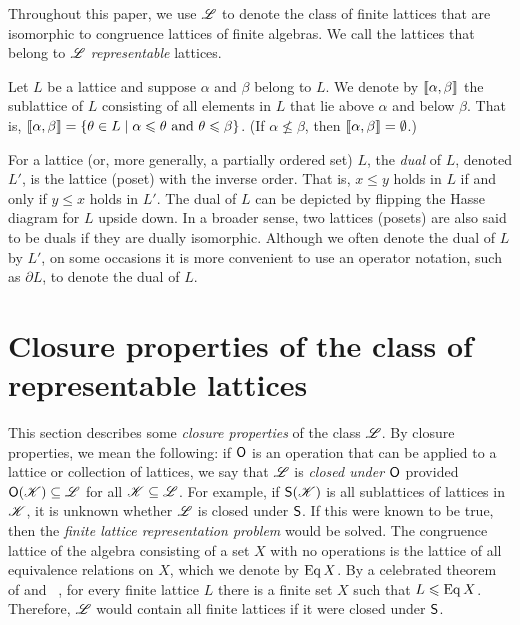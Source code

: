 Throughout this paper, we use $\mathscr{L}$ to denote the class of finite lattices that
are isomorphic to congruence lattices of finite algebras. 
We call the lattices that belong to $\mathscr{L}$ \emph{representable} lattices. 

Let $L$ be a lattice and suppose $\alpha$ and $\beta$ belong to $L$.  
We denote by $\llbracket \alpha, \beta \rrbracket$ the sublattice of $L$ consisting of all elements in $L$
that lie above $\alpha$ and below $\beta$.  
That is, 
$\llbracket \alpha, \beta \rrbracket = 
\{\theta \in L \mid \alpha \leqslant \theta \text{ and } \theta \leqslant \beta\}$.
(If $\alpha \nleq \beta$, then $\llbracket \alpha, \beta \rrbracket = \emptyset$.)

For a lattice (or, more generally, a partially ordered set) 
$L$, the \emph{dual} of $L$, denoted
$L'$, is the lattice (poset) with the inverse order. That is, 
$x \leq y$ holds in $L$ if and only if $y \leq x$ holds in $L'$. 
The dual of $L$ can be depicted by flipping the Hasse diagram
for $L$ upside down. 
In a broader sense, two lattices (posets) are also said to be duals if they are
dually isomorphic.
Although we often denote the dual of $L$ by $L'$, on some occasions it is more
convenient to use an operator notation, such as $\partial L$, to denote the dual of
$L$. 


\section{Closure properties of the class of representable lattices}
\label{sec:clos-prop-class}
This section describes some
\emph{closure properties}
of the class $\mathscr{L}$. %
By closure properties, we mean the following: if $\mathsf{O}$ is an operation that can
be applied to a lattice or collection of lattices, we say that $\mathscr{L}$ is
\emph{closed under $\mathsf{O}$} provided $\mathsf{O}(\mathscr{K}) \subseteq \mathscr{L}$ for all 
$\mathscr{K}\subseteq \mathscr{L}$. For example, if 
$\mathsf{S}(\mathscr{K})$ is all sublattices of lattices in $\mathscr{K}$, 
it is unknown whether $\mathscr{L}$ is closed under $\mathsf{S}$.  
If this were known to be true, then the 
\emph{finite lattice representation problem} would be solved.
The congruence lattice of the algebra consisting of a
set $X$ with no operations is the lattice of all equivalence relations on $X$,
which we denote by $\operatorname{Eq} X$.
By a celebrated theorem of \Pudlak and \Tuma~\cite{Pudlak:1980}, for every finite
lattice $L$ there is a finite set $X$ such that $L\leqslant \operatorname{Eq} X$.  Therefore, $\mathscr{L}$
would contain all finite lattices if it were closed under $\mathsf{S}$.


